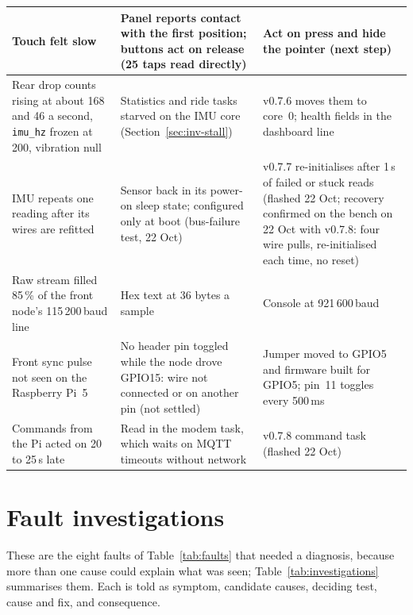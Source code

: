 \begin{longtable}{|>{\raggedright\arraybackslash}p{3.6cm}|>{\raggedright\arraybackslash}p{5.0cm}|>{\raggedright\arraybackslash}p{4.9cm}|}
Touch felt slow & Panel reports contact with the first position; buttons act on release (25 taps read directly) & Act on press and hide the pointer (next step) \\ \hline
Rear drop counts rising at about 168 and 46 a second, \texttt{imu\_hz} frozen at 200, vibration null & Statistics and ride tasks starved on the IMU core (Section~\ref{sec:inv-stall}) & v0.7.6 moves them to core~0; health fields in the dashboard line \\ \hline
IMU repeats one reading after its wires are refitted & Sensor back in its power-on sleep state; configured only at boot (bus-failure test, 22 Oct) & v0.7.7 re-initialises after 1\,s of failed or stuck reads (flashed 22 Oct; recovery confirmed on the bench on 22 Oct with v0.7.8: four wire pulls, re-initialised each time, no reset) \\ \hline
Raw stream filled 85\,\% of the front node's 115\,200\,baud line & Hex text at 36 bytes a sample & Console at 921\,600\,baud \\ \hline
Front sync pulse not seen on the Raspberry Pi~5 & No header pin toggled while the node drove GPIO15: wire not connected or on another pin (not settled) & Jumper moved to GPIO5 and firmware built for GPIO5; pin~11 toggles every 500\,ms \\ \hline
Commands from the Pi acted on 20 to 25\,s late & Read in the modem task, which waits on MQTT timeouts without network & v0.7.8 command task (flashed 22 Oct) \\ \hline
\end{longtable}

\section{Fault investigations}
\label{sec:investigations}

These are the eight faults of Table~\ref{tab:faults} that needed a diagnosis, because more than one cause could explain what was seen; Table~\ref{tab:investigations} summarises them. Each is told as symptom, candidate causes, deciding test, cause and fix, and consequence.

